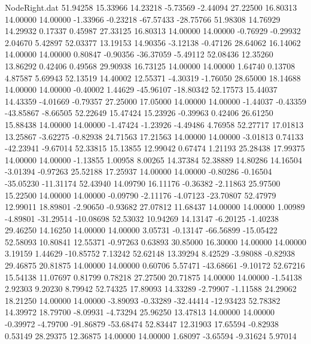 \begin{filecontents}{NodeRight.dat}
  51.94258   15.33966   14.23218    -5.73569   -2.44094   27.22500   16.80313   14.00000   14.00000   -1.33966   -0.23218  -67.57433  -28.75766
  51.98308   14.76929   14.29932     0.17337    0.45987   27.33125   16.80313   14.00000   14.00000   -0.76929   -0.29932    2.04670    5.42897
  52.03377   13.19153   14.90356    -3.12138   -0.47126   28.64062   16.14062   14.00000   14.00000    0.80847   -0.90356  -36.37059   -5.49112
  52.08436   12.35260   13.86292     0.42406    0.49568   29.90938   16.73125   14.00000   14.00000    1.64740    0.13708    4.87587    5.69943
  52.13519   14.40002   12.55371    -4.30319   -1.76050   28.65000   18.14688   14.00000   14.00000   -0.40002    1.44629  -45.96107  -18.80342
  52.17573   15.44037   14.43359    -4.01669   -0.79357   27.25000   17.05000   14.00000   14.00000   -1.44037   -0.43359  -43.85867   -8.66505
  52.22649   15.47424   15.23926    -0.39963    0.42406   26.61250   15.88438   14.00000   14.00000   -1.47424   -1.23926   -4.49486    4.76958
  52.27717   17.01813   13.25867    -3.62275   -0.82938   24.71563   17.21563   14.00000   14.00000   -3.01813    0.74133  -42.23941   -9.67014
  52.33815   15.13855   12.99042     0.67474    1.21193   25.28438   17.99375   14.00000   14.00000   -1.13855    1.00958    8.00265   14.37384
  52.38889   14.80286   14.16504    -3.01394   -0.97263   25.52188   17.25937   14.00000   14.00000   -0.80286   -0.16504  -35.05230  -11.31174
  52.43940   14.09790   16.11176    -0.36382   -2.11863   25.97500   15.22500   14.00000   14.00000   -0.09790   -2.11176   -4.07123  -23.70807
  52.47979   12.99011   18.89801    -2.90650   -0.93682   27.07812   11.68437   14.00000   14.00000    1.00989   -4.89801  -31.29514  -10.08698
  52.53032   10.94269   14.13147    -6.20125   -1.40238   29.46250   14.16250   14.00000   14.00000    3.05731   -0.13147  -66.56899  -15.05422
  52.58093   10.80841   12.55371    -0.97263    0.63893   30.85000   16.30000   14.00000   14.00000    3.19159    1.44629  -10.85752    7.13242
  52.62148   13.39294    8.42529    -3.98088   -0.82938   29.46875   20.81875   14.00000   14.00000    0.60706    5.57471  -43.68661   -9.10172
  52.67216   15.54138   11.07697     0.81799    0.78218   27.27500   20.71875   14.00000   14.00000   -1.54138    2.92303    9.20230    8.79942
  52.74325   17.89093   14.33289    -2.79907   -1.11588   24.29062   18.21250   14.00000   14.00000   -3.89093   -0.33289  -32.44414  -12.93423
  52.78382   14.39972   18.79700    -8.09931   -4.73294   25.96250   13.47813   14.00000   14.00000   -0.39972   -4.79700  -91.86879  -53.68474
  52.83447   12.31903   17.65594    -0.82938    0.53149   28.29375   12.36875   14.00000   14.00000    1.68097   -3.65594   -9.31624    5.97014

\end{filecontents}
